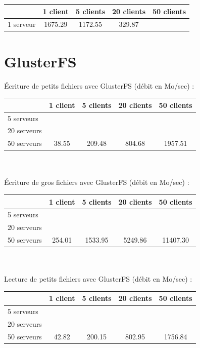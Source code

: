 \documentclass[12pt]{report}
\begin{document}
			\begin{tabular}{|l|c|c|c|c|}
				\hline
				& 1 client & 5 clients & 20 clients & 50 clients \\
				\hline
				1 serveur & 1675.29 & 1172.55 & 329.87& \\
				\hline
			\end{tabular}

			\newpage

			\section{GlusterFS}

			Écriture de petits fichiers avec GlusterFS (débit en Mo/sec) :

			\begin{tabular}{|l|c|c|c|c|}
				\hline
				& 1 client & 5 clients & 20 clients & 50 clients \\
				\hline
				5 serveurs & & & & \\
				\hline
				20 serveurs & & & & \\
				\hline
				50 serveurs & 38.55 & 209.48 & 804.68 & 1957.51 \\
				\hline
			\end{tabular}\\\\

			Écriture de gros fichiers avec GlusterFS (débit en Mo/sec) :

			\begin{tabular}{|l|c|c|c|c|}
				\hline
				& 1 client & 5 clients & 20 clients & 50 clients \\
				\hline
				5 serveurs & & & & \\
				\hline
				20 serveurs & & & & \\
				\hline
				50 serveurs & 254.01 & 1533.95 & 5249.86 & 11407.30 \\
				\hline
			\end{tabular}\\\\

			Lecture de petits fichiers avec GlusterFS (débit en Mo/sec) :

			\begin{tabular}{|l|c|c|c|c|}
				\hline
				& 1 client & 5 clients & 20 clients & 50 clients \\
				\hline
				5 serveurs & & & & \\
				\hline
				20 serveurs & & & & \\
				\hline
				50 serveurs & 42.82 & 200.15 & 802.95 & 1756.84 \\
				\hline
			\end{tabular}\\\\
\end{document}
